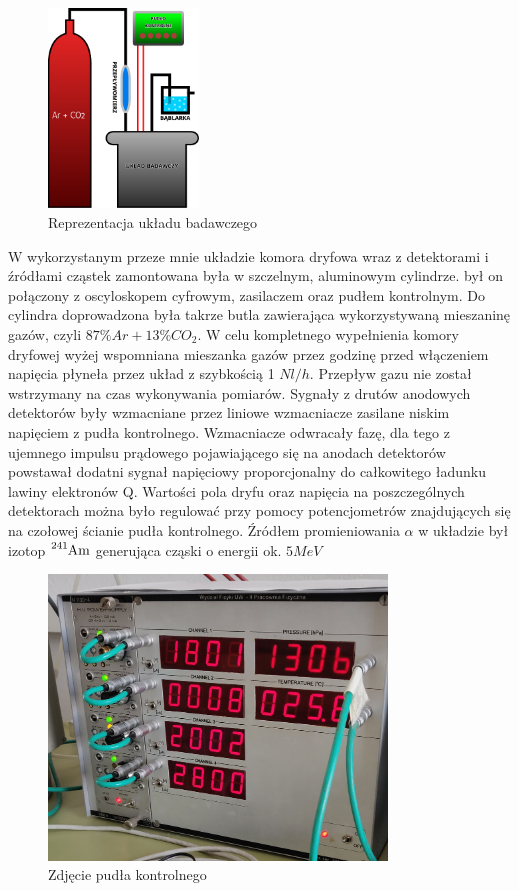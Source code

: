 \documentclass[10pt,a4paper]{article}
\begin{document}
\begin{figure}
    \centering
    \includegraphics[width=4cm]{diagrams/schemat_budowy.pdf}
    \caption{Reprezentacja układu badawczego}
    \label{reytwitrewtrewtr}
\end{figure}
W wykorzystanym przeze mnie układzie komora dryfowa wraz z detektorami i źródłami cząstek zamontowana była w szczelnym, aluminowym cylindrze. był on połączony z oscyloskopem cyfrowym, zasilaczem oraz pudłem kontrolnym. Do cylindra doprowadzona była takrze butla zawierająca wykorzystywaną mieszaninę gazów, czyli $87\%Ar + 13\% CO_2$. W celu kompletnego wypełnienia komory dryfowej wyżej wspomniana mieszanka gazów przez godzinę przed włączeniem napięcia płyneła przez układ z szybkością 1 $Nl/h$. Przepływ gazu nie został wstrzymany na czas wykonywania pomiarów. Sygnały z drutów anodowych detektorów były wzmacniane przez liniowe wzmacniacze zasilane niskim napięciem z pudła kontrolnego. Wzmacniacze odwracały fazę, dla tego z ujemnego impulsu prądowego pojawiającego się na anodach detektorów powstawał dodatni sygnał napięciowy proporcjonalny do całkowitego ładunku lawiny elektronów Q. Wartości pola dryfu oraz napięcia na poszczególnych detektorach można było regulować przy pomocy potencjometrów znajdujących się na czołowej ścianie pudła kontrolnego. Źródłem promieniowania $\alpha$ w układzie był izotop $\ce{^{241}Am}$ generująca cząski o energii ok. $5 MeV$ \cite{instrukcja}

\begin{figure}[h]
    \centering
    \includegraphics[width=9cm]{diagrams/IMG_20210325_145922__01.jpg}
    \caption{Zdjęcie pudła kontrolnego}
    \label{zdjacie2}
\end{figure}
\end{document}
